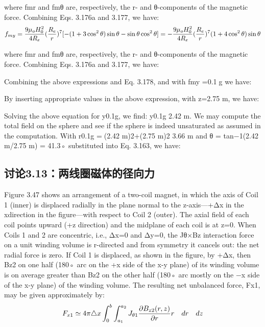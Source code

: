 where fmr and fmθ are, respectively, the r- and θ-components of the magnetic
force. Combining Eqs. 3.176a and 3.177, we have:
$$
f_{my}=\frac{9\mu_{o}H_{0}^{2}}{4R_{e}}(\frac{R_{e}}{r})^{7}[-(1+3\cos^{2}\theta)\sin\theta-\sin\theta\cos^{2}\theta]\\
=-\frac{9\mu_{o}H_{0}^{2}}{4R_{e}}(\frac{R_{e}}{r})^{7}(1+4\cos^{2}\theta)\sin\theta\\%
$$

where fmr and fmθ are, respectively, the r- and θ-components of the magnetic
force. Combining Eqs. 3.176a and 3.177, we have:

Combining the above expressions and Eq. 3.178, and with fmy =0.1g we have:

By inserting appropriate values in the above expression, with z=2.75 m, we have:

Solving the above equation for y0.1g, we find: y0.1g  2.42 m.
We may compute the total field on the sphere and see if the sphere is indeed unsaturated as assumed in the computation. With r0.1g =(2.42 m)2+(2.75 m)2 
3.66 m and θ = tan−1(2.42 m/2.75 m) = 41.3◦ substituted into Eq. 3.163, we have:

\newpage




\subsection{讨论3.13：两线圈磁体的径向力}
Figure 3.47 shows an arrangement of a two-coil magnet, in which the axis of Coil
1 (inner) is displaced radially in the plane normal to the z-axis—+Δx in the xdirection in the figure—with respect to Coil 2 (outer). The axial field of each coil
points upward (+z direction) and the midplane of each coil is at z=0.
When Coils 1 and 2 are concentric, i.e., Δx=0 and Δy=0, the Jθ×Bz interaction
force on a unit winding volume is r-directed and from symmetry it cancels out:
the net radial force is zero. If Coil 1 is displaced, as shown in the figure, by +Δx,
then Bz2 on one half (180◦ arc on the +x side of the x-y plane) of its winding
volume is on average greater than Bz2 on the other half (180◦ arc mostly on the
−x side of the x-y plane) of the winding volume. The resulting net unbalanced
force, Fx1, may be given approximately by:
$$
F_{x1}\simeq4\pi\triangle x\int_{0}^{b}\int_{a_{1}}^{a_{2}}J_{\theta1}\frac{\partial B_{z2}(r,z)}{\partial r}r\quad dr\quad dz\\%
$$

